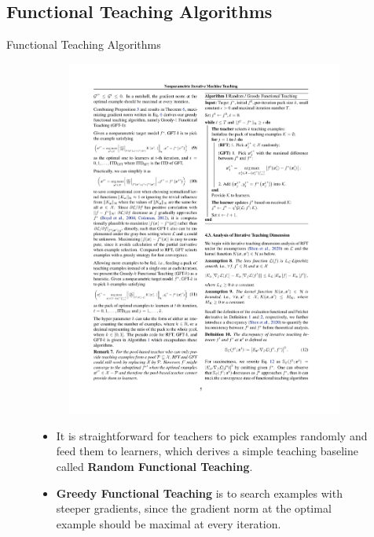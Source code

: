 \documentclass[aspectratio=169,xcolor=dvipsnames]{beamer}
\begin{document}
\subsection{Functional Teaching Algorithms}

\begin{frame}{Functional Teaching Algorithms}

\begin{figure}[h]
  \begin{minipage}{0.4\textwidth}
    \begin{figure}
      \includegraphics[width=0.92\linewidth]{algo.pdf}
    \end{figure}
  \end{minipage}
  \hfill
  \begin{minipage}{0.55\textwidth} 
    \begin{itemize}
        \item It is straightforward for teachers to pick examples \alert{randomly} and feed them to learners, which derives a simple teaching baseline called \textbf{Random Functional Teaching}.
        \item \textbf{Greedy Functional Teaching} is to search examples with \alert{steeper} gradients, since the gradient norm at the optimal example should be \alert{maximal} at every iteration.
    \end{itemize}

  \end{minipage}
\end{figure}



\end{frame}
\end{document}
